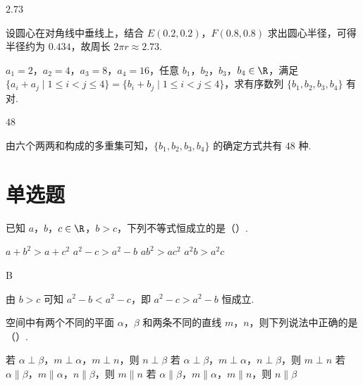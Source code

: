 \begin{answer}
\(2.73\)
\end{answer}

\begin{solution}
设圆心在对角线中垂线上，结合 \(E(0.2,0.2)\)，\(F(0.8,0.8)\) 求出圆心半径，可得半径约为 \(0.434\)，故周长 \(2\pi r\approx 2.73\).
\end{solution}

\begin{problem}
\(a_1=2\)，\(a_2=4\)，\(a_3=8\)，\(a_4=16\)，任意 \(b_1\)，\(b_2\)，\(b_3\)，\(b_4\in \R\)，满足 \(\{a_i+a_j\mid 1\le i<j\le 4\}=\{b_i+b_j\mid 1\le i<j\le 4\}\)，求有序数列 \(\{b_1,b_2,b_3,b_4\}\) 有\fillinblank{} 对.
\end{problem}

\begin{answer}
\(48\)
\end{answer}

\begin{solution}
由六个两两和构成的多重集可知，\(\{b_1,b_2,b_3,b_4\}\) 的确定方式共有 \(48\) 种.
\end{solution}
\section{单选题}

\begin{problem}
已知 \(a\)，\(b\)，\(c\in \R\)，\(b>c\)，下列不等式恒成立的是（\quad）.

\choices
    {\(a+b^2>a+c^2\)}
    {\(a^2-c>a^2-b\)}
    {\(ab^2>ac^2\)}
    {\(a^2b>a^2c\)}
\end{problem}

\begin{answer}
B
\end{answer}

\begin{solution}
由 \(b>c\) 可知 \(a^2-b<a^2-c\)，即 \(a^2-c>a^2-b\) 恒成立.
\end{solution}

\begin{problem}
空间中有两个不同的平面 \(\alpha\)，\(\beta\) 和两条不同的直线 \(m\)，\(n\)，则下列说法中正确的是（\quad）.

\choices
    {若 \(\alpha\perp\beta\)，\(m\perp\alpha\)，\(m\perp n\)，则 \(n\perp\beta\)}
    {若 \(\alpha\perp\beta\)，\(m\perp\alpha\)，\(n\perp\beta\)，则 \(m\perp n\)}
    {若 \(\alpha\parallel\beta\)，\(m\parallel\alpha\)，\(n\parallel\beta\)，则 \(m\parallel n\)}
    {若 \(\alpha\parallel\beta\)，\(m\parallel\alpha\)，\(m\parallel n\)，则 \(n\parallel\beta\)}
\end{problem}

